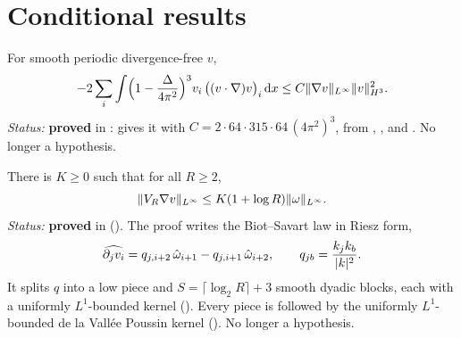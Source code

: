 \documentclass[11pt]{article}
\begin{document}
\section{Conditional results}\label{sec:conditional}
\begin{hyp}[\lean{PeriodicPhysicalCommutatorBound}~$C$\coined, $s=3$]
For smooth periodic divergence-free $v$,
\begin{equation}\label{eq:commutator}
-2\sum_i\int \Bigl(1-\frac{\Delta}{4\pi^2}\Bigr)^{3}v_i\,\bigl((v\cdot\nabla)v\bigr)_i\,\mathrm{d} x\le C\lVert\nabla v\rVert_{L^\infty}\lVert v\rVert_{H^3}^2 .
\end{equation}
\emph{Status:} \textbf{proved} in : \coined{} gives it with $C=2\cdot64\cdot315\cdot64\,(4\pi^2)^3$, from , , \coined{} and \coined. No longer a hypothesis.
\end{hyp}
\begin{hyp}
There is $K\ge0$ such that for all $R\ge2$,
\begin{equation}\label{eq:lowfreq}
\lVert V_R\nabla v\rVert_{L^\infty}\le K(1+\log R)\lVert\omega\rVert_{L^\infty}.
\end{equation}
\emph{Status:} \textbf{proved} in  (\coined). The proof writes the Biot--Savart law in Riesz form,
\[
\widehat{\partial_jv_i}=q_{j,i+2}\,\hat\omega_{i+1}-q_{j,i+1}\,\hat\omega_{i+2},\qquad q_{jb}=\frac{k_jk_b}{\lvert k\rvert^2}.
\]
It splits $q$ into a low piece and $S=\lceil\log_2R\rceil+3$ smooth dyadic blocks, each with a uniformly $L^1$-bounded kernel (). Every piece is followed by the uniformly $L^1$-bounded de la Vall\'ee Poussin kernel (). No longer a hypothesis.
\end{hyp}
\end{document}
